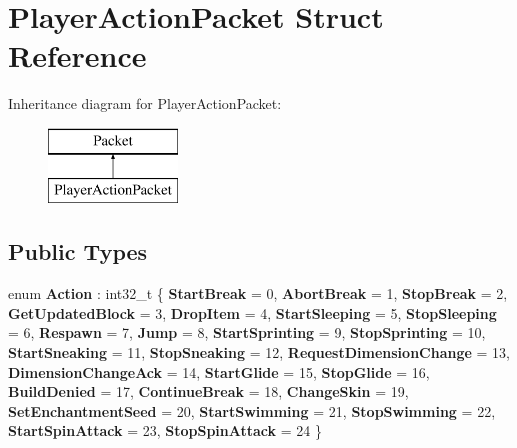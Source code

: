 \hypertarget{struct_player_action_packet}{}\section{Player\+Action\+Packet Struct Reference}
\label{struct_player_action_packet}
Inheritance diagram for Player\+Action\+Packet\+:\begin{figure}[H]
\begin{center}
\leavevmode
\includegraphics[height=2.000000cm]{struct_player_action_packet}
\end{center}
\end{figure}
\subsection*{Public Types}
\begin{DoxyCompactItemize}
\item 
\mbox{\label{struct_player_action_packet_ad6ead6bab7158511db0e7cdd201aa183}} 
enum {\bfseries Action} \+: int32\+\_\+t \{ \newline
{\bfseries Start\+Break} = 0, 
{\bfseries Abort\+Break} = 1, 
{\bfseries Stop\+Break} = 2, 
{\bfseries Get\+Updated\+Block} = 3, 
\newline
{\bfseries Drop\+Item} = 4, 
{\bfseries Start\+Sleeping} = 5, 
{\bfseries Stop\+Sleeping} = 6, 
{\bfseries Respawn} = 7, 
\newline
{\bfseries Jump} = 8, 
{\bfseries Start\+Sprinting} = 9, 
{\bfseries Stop\+Sprinting} = 10, 
{\bfseries Start\+Sneaking} = 11, 
\newline
{\bfseries Stop\+Sneaking} = 12, 
{\bfseries Request\+Dimension\+Change} = 13, 
{\bfseries Dimension\+Change\+Ack} = 14, 
{\bfseries Start\+Glide} = 15, 
\newline
{\bfseries Stop\+Glide} = 16, 
{\bfseries Build\+Denied} = 17, 
{\bfseries Continue\+Break} = 18, 
{\bfseries Change\+Skin} = 19, 
\newline
{\bfseries Set\+Enchantment\+Seed} = 20, 
{\bfseries Start\+Swimming} = 21, 
{\bfseries Stop\+Swimming} = 22, 
{\bfseries Start\+Spin\+Attack} = 23, 
\newline
{\bfseries Stop\+Spin\+Attack} = 24
 \}
\end{DoxyCompactItemize}
